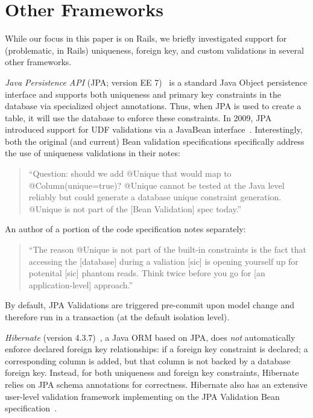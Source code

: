 
\section{Other Frameworks}
\label{sec:other-orms}

While our focus in this paper is on Rails, we briefly investigated
support for (problematic, in Rails) uniqueness, foreign key, and
custom validations in several other frameworks.

\newcommand{\orm}[1]{{\vspace{.45em}\noindent\textit{#1}}}

\orm{Java Persistence API} (JPA; version EE 7)~\cite{code-jpa} is a
standard Java Object persistence interface and supports both
uniqueness and primary key constraints in the database via specialized
object annotations. Thus, when JPA is used to create a table, it will
use the database to enforce these constraints. In 2009, JPA introduced
support for UDF validations via a JavaBean
interface~\cite{code-bean-validation}. Interestingly, both the
original (and current) Bean validation specifications specifically
address the use of uniqueness validations in their notes:
\begin{quote}
``Question: should we add @Unique that would map to @Column(unique=true)?
@Unique cannot be tested at the Java level reliably but could generate
a database unique constraint generation. @Unique is not part
of the [Bean Validation] spec today.''~\cite{jsr-bean}
\end{quote}
An author of a portion of the code specification notes separately:
\begin{quote}
  ``The reason @Unique is not part of the built-in constraints is the
  fact that accessing the [database] during a valiation [sic] is
  opening yourself up for potenital [sic] phantom reads. Think twice
  before you go for [an application-level] approach.''~\cite{unique-bean}
\end{quote}
By default, JPA Validations are triggered pre-commit upon model change
and therefore run in a transaction (at the default isolation level).

\orm{Hibernate} (version 4.3.7)~\cite{code-hibernate}, a Java ORM
based on JPA, does \textit{not} automatically enforce declared foreign
key relationships: if a foreign key constraint is declared; a
corresponding column is added, but that column is not backed by a
database foreign key. Instead, for both uniqueness and foreign key
constraints, Hibernate relies on JPA schema annotations for
correctness. Hibernate also has an extensive user-level validation
framework implementing on the JPA Validation Bean
specification~\cite{code-hibernate-validator}.

